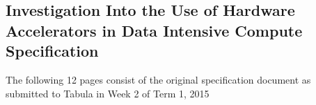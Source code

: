 \documentclass[12pt,a4paper]{article}
\begin{document}
	\printbibliography
	
	\begin{appendix}
	    \section{Investigation Into the Use of Hardware Accelerators in Data Intensive Compute Specification}
	    The following 12 pages consist of the original specification document as submitted to Tabula in Week 2 of Term 1, 2015
	    \label{app:specification}
	    
	        
	\end{appendix}
\end{document}
